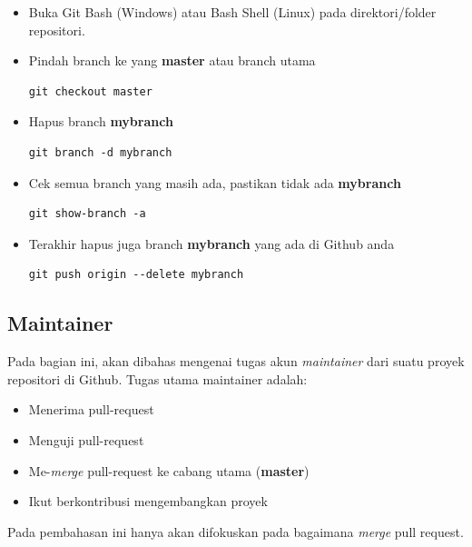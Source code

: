 \documentclass[12pt]{article}
\begin{document}
	\begin{itemize}
		\item Buka Git Bash (Windows) atau Bash Shell (Linux) pada direktori/folder repositori.
		
		\item Pindah branch ke yang \textbf{master} atau branch utama
		\begin{verbatim}
git checkout master
		\end{verbatim}
		
		\item Hapus branch \textbf{mybranch}
		\begin{verbatim}
git branch -d mybranch
		\end{verbatim}
		
		\item Cek semua branch yang masih ada, pastikan tidak ada \textbf{mybranch}
		\begin{verbatim}
git show-branch -a
		\end{verbatim}
		
		\item Terakhir hapus juga branch \textbf{mybranch} yang ada di Github anda
		\begin{verbatim}
git push origin --delete mybranch
		\end{verbatim}
		
	\end{itemize}

	\subsection{Maintainer}
	
	Pada bagian ini, akan dibahas mengenai tugas akun \textit{maintainer} dari suatu proyek repositori di Github.
	Tugas utama maintainer adalah:
	
	\begin{itemize}
		\item Menerima pull-request
		\item Menguji pull-request
		\item Me-\textit{merge} pull-request ke cabang utama (\textbf{master})
		\item Ikut berkontribusi mengembangkan proyek
	\end{itemize} 

	Pada pembahasan ini hanya akan difokuskan pada bagaimana \textit{merge} pull request.
\end{document}
